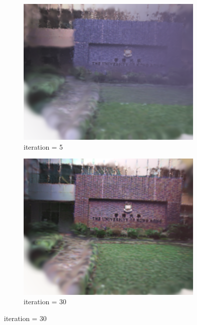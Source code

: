 \documentclass[lettersize,journal]{IEEEtran}
\begin{document}
\begin{figure}[h]
    \begin{subfigure}{0.15\textwidth}
        \includegraphics[width=\linewidth]{image/runtime/5.png}
        \caption{iteration = 5}
        \label{fig:runtime5}
    \end{subfigure}
    \hspace{0.0001\textwidth} %
    \begin{subfigure}{0.15\textwidth}
        \includegraphics[width=\linewidth]{image/runtime/30.png}
        \caption{iteration = 30}
        \label{fig:runtime30}

\end{subfigure}
\end{figure}
\end{document}
